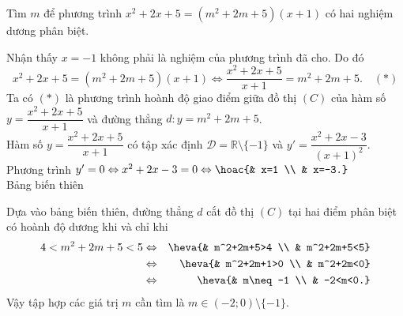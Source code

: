 \begin{bt}%
Tìm $m$ để phương trình $x^2+2x+5=\left(m^2+2m+5\right)(x+1)$ có hai nghiệm dương phân biệt.
\loigiai
{Nhận thấy $x=-1$ không phải là nghiệm của phương trình đã cho. Do đó
\[x^2+2x+5=\left(m^2+2m+5\right)(x+1)\Leftrightarrow\dfrac{x^2+2x+5}{x+1}=m^2+2m+5.\quad (*)\]
Ta có $(*)$ là phương trình hoành độ giao điểm giữa đồ thị $(C)$ của hàm số $y=\dfrac{x^2+2x+5}{x+1}$ và đường thẳng $d\colon y=m^2+2m+5$.\\
Hàm số $y=\dfrac{x^2+2x+5}{x+1}$ có tập xác định $\mathscr{D}=\mathbb{R}\setminus\{-1\}$ và $y'=\dfrac{x^2+2x-3}{(x+1)^2}$.\\
Phương trình $y'=0\Leftrightarrow x^2+2x-3=0\Leftrightarrow\hoac{& x=1 \\ & x=-3.}$\\
Bảng biến thiên
\begin{center}
\end{center}
Dựa vào bảng biến thiên, đường thẳng $d$ cắt đồ thị $(C)$ tại hai điểm phân biệt có hoành độ dương khi và chỉ khi \begin{eqnarray*}
4<m^2+2m+5<5 &\Leftrightarrow &\heva{& m^2+2m+5>4 \\ & m^2+2m+5<5}\\
&\Leftrightarrow & \heva{& m^2+2m+1>0 \\ & m^2+2m<0}\\
&\Leftrightarrow & \heva{& m\neq -1 \\ & -2<m<0.}
\end{eqnarray*}
Vậy tập hợp các giá trị $m$ cần tìm là $m\in (-2;0)\setminus\{-1\}$.
}
\end{bt}

